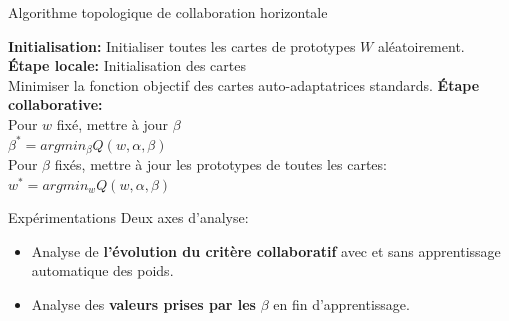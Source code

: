 \documentclass[hyperref={pdfpagelabels=false}]{beamer}
\begin{document}
    \begin{frame}
        \begin{algorithm}[H]
            \caption{Algorithme topologique de collaboration horizontale}
            \textbf{Initialisation:} Initialiser toutes les cartes de
            prototypes $W$ aléatoirement. \\
            \textbf{Étape locale:} Initialisation des cartes\\
             {
                Minimiser la fonction objectif des cartes auto-adaptatrices
                standards.
            } 
            \textbf{Étape collaborative:}\\
             {
                Pour $w$ fixé, mettre à jour $\beta$\\
                $ \beta^{*} =  argmin_{\beta}Q(w,\alpha,\beta) $\\
                Pour $\beta$ fixés, mettre à jour les prototypes de 
                toutes les cartes:\\
                $ w^{*} =  argmin_{w}Q(w,\alpha,\beta) $
            }	 
        \end{algorithm}
    \end{frame}

    \begin{frame}{Expérimentations}
        Deux axes d'analyse:
        \begin{itemize}
            \item Analyse de \textbf{l'évolution du critère 
                collaboratif} avec et sans apprentissage automatique des 
                poids.
            \item Analyse des \textbf{valeurs prises par les} $\beta$ en 
                fin d'apprentissage.
        \end{itemize}


    \end{frame}
\end{document}
